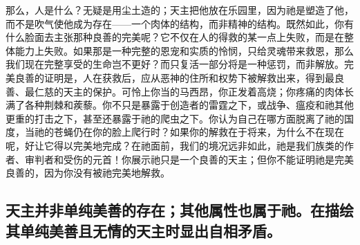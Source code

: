 那么，人是什么？无疑是用尘土造的；天主把他放在乐园里，因为祂是塑造了他，而不是吹气使他成为存在——一个肉体的结构，而非精神的结构。既然如此，你有什么脸面去主张那种良善的完美呢？它不仅在人的得救的某一点上失败，而是在整体能力上失败。如果那是一种完整的恩宠和实质的怜悯，只给灵魂带来救恩，那么我们现在完整享受的生命岂不更好？而只复活一部分将是一种惩罚，而非解放。完美良善的证明是，人在获救后，应从恶神的住所和权势下被解救出来，得到最良善、最仁慈的天主的保护。可怜上你当的马西昂，你正发着高烧；你疼痛的肉体长满了各种荆棘和蒺藜。你不只是暴露于创造者的雷霆之下，或战争、瘟疫和祂其他更重的打击之下，甚至还暴露于祂的爬虫之下。你认为自己在哪方面脱离了祂的国度，当祂的苍蝇仍在你的脸上爬行时？如果你的解救在于将来，为什么不在现在呢，好让它得以完美地完成？在祂面前，我们的境况远非如此，祂是我们族类的作者、审判者和受伤的元首！你展示祂只是一个良善的天主；但你不能证明祂是完美良善的，因为你没有被祂完美地解救。\par


\subsection{天主并非单纯美善的存在；其他属性也属于祂。在描绘其单纯美善且无情的天主时显出自相矛盾。}

